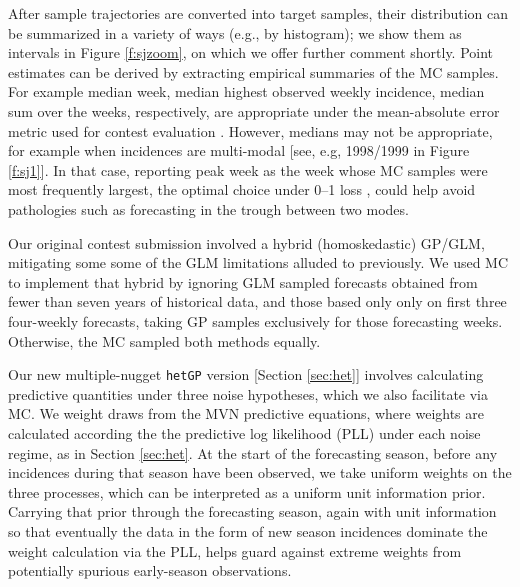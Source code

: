 \documentclass[12pt]{article}
\begin{document}
After sample trajectories are converted into target samples, their
distribution can be summarized in a variety of ways (e.g., by histogram); we
show them as intervals in Figure \ref{f:sjzoom}, on which we offer further
comment shortly. Point estimates can be derived by extracting empirical
summaries of the MC samples.  For example median week,  median highest
observed weekly incidence, median sum over the weeks, respectively, are
appropriate under the mean-absolute error metric used for contest evaluation
\citep{gneiting:2011}.   However, medians may not be appropriate, for example
when incidences are multi-modal [see, e.g, 1998/1999 in Figure \ref{f:sj1}].
In that case, reporting peak week as the week whose MC samples were most
frequently largest, the optimal choice under 0--1 loss \citep{gneiting:2017},
could help avoid pathologies such as forecasting in the trough between two
modes.

Our original contest submission involved a hybrid (homoskedastic) GP/GLM,
mitigating some some of the GLM limitations alluded to previously. We used MC
to implement that hybrid by ignoring GLM sampled forecasts obtained from fewer
than seven years of historical data, and those based only only on first three
four-weekly forecasts, taking GP samples exclusively for those forecasting
weeks. Otherwise, the MC sampled both methods equally.

Our new multiple-nugget {\tt hetGP} version [Section \ref{sec:het}] involves
calculating predictive quantities under three noise hypotheses, which we also
facilitate via MC. We weight draws from the MVN predictive equations, where
weights are calculated according the the predictive log likelihood (PLL) under
each noise regime, as in Section \ref{sec:het}.  At the start of the
forecasting season, before any incidences during that season have been
observed, we take uniform weights on the three processes, which can be
interpreted as a uniform unit information prior.  Carrying that prior through
the forecasting season, again with unit information so that eventually the
data in the form of new season incidences dominate the weight calculation via
the PLL, helps guard against extreme weights from potentially spurious early-season observations.
\end{document}
